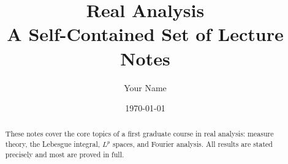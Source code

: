 \documentclass[11pt]{article}
\title{%
    {\sffamily\huge\bfseries\color{DarkNavy} Real Analysis}\\[6pt]
    {\sffamily\large\color{AccentGray} A Self-Contained Set of Lecture Notes}
}
\author{{\sffamily Your Name}}
\date{{\sffamily\small\color{AccentGray} \today}}
\begin{document}

\pagecolor{OffWhite}
\color{DarkNavy}

\maketitle
\thispagestyle{plain}

\begin{abstract}
\noindent
These notes cover the core topics of a first graduate course in real analysis:
measure theory, the Lebesgue integral, $L^p$ spaces, and Fourier analysis.
All results are stated precisely and most are proved in full.
\end{abstract}

\tableofcontents
\newpage



\printindex
\end{document}
